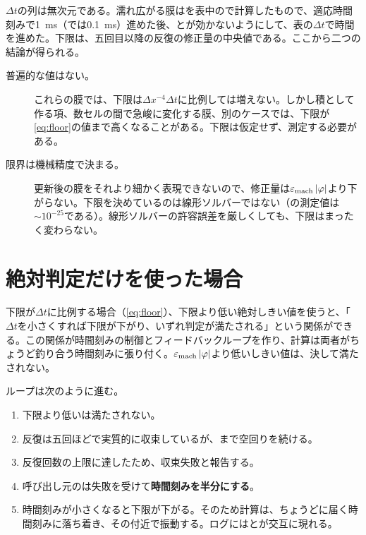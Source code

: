 $\Delta t$の列は無次元である。濡れ広がる膜はを表中ので計算したもので、適応時間刻みで\SI{1}{\milli\second}（では\SI{0.1}{\milli\second}）進めた後、とが効かないようにして、表の$\Delta t$で時間を進めた。下限は、五回目以降の反復の修正量の中央値である。ここから二つの結論が得られる。

\begin{description}
  \item[普遍的な値はない。] これらの膜では、下限は$\Delta x^{-4}\Delta t$に比例しては増えない。しかし積として作る項、数セルの間で急峻に変化する膜、別のケースでは、下限が\cref{eq:floor}の値まで高くなることがある。下限は仮定せず、測定する必要がある。
  \item[限界は機械精度で決まる。] 更新後の膜をそれより細かく表現できないので、修正量は$\varepsilon_{\mathrm{mach}}\,\lvert\varphi\rvert$より下がらない。下限を決めているのは線形ソルバーではない（の測定値は$\sim 10^{-25}$である）。線形ソルバーの許容誤差を厳しくしても、下限はまったく変わらない。
\end{description}

\section{絶対判定だけを使った場合}
\label{sec:convergence:absolute}

\begin{warn}[絶対判定だけの収束判定を使わない]
  下限が$\Delta t$に比例する場合（\cref{eq:floor}）、下限より低い絶対しきい値を使うと、「$\Delta t$を小さくすれば下限が下がり、いずれ判定が満たされる」という関係ができる。この関係が時間刻みの制御とフィードバックループを作り、計算は両者がちょうど釣り合う時間刻みに張り付く。$\varepsilon_{\mathrm{mach}}\,\lvert\varphi\rvert$より低いしきい値は、決して満たされない。
\end{warn}

ループは次のように進む。

\begin{enumerate}
  \item 下限より低いは満たされない。
  \item 反復は五回ほどで実質的に収束しているが、まで空回りを続ける。
  \item 反復回数の上限に達したため、収束失敗と報告する。
  \item 呼び出し元のは失敗を受けて\textbf{時間刻みを半分にする}。
  \item 時間刻みが小さくなると下限が下がる。そのため計算は、ちょうどに届く時間刻みに落ち着き、その付近で振動する。ログにはとが交互に現れる。
\end{enumerate}

